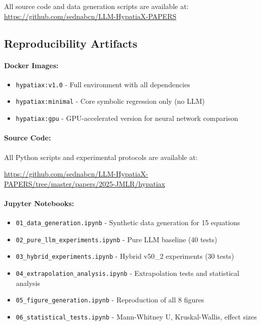 \documentclass[twoside,11pt]{article}
\begin{document}
All source code and data generation scripts are available at:
\url{https://github.com/sednabcn/LLM-HypatiaX-PAPERS}

\subsection{Reproducibility Artifacts}

\paragraph{Docker Images:}
\begin{itemize}
\item \texttt{hypatiax:v1.0} - Full environment with all dependencies
\item \texttt{hypatiax:minimal} - Core symbolic regression only (no LLM)
\item \texttt{hypatiax:gpu} - GPU-accelerated version for neural network comparison
\end{itemize}

\paragraph{Source Code:}
All Python scripts and experimental protocols are available at:
\begin{center}
{\small\url{https://github.com/sednabcn/LLM-HypatiaX-PAPERS/tree/master/papers/2025-JMLR/hypatiax}}
\end{center}

 
\paragraph{Jupyter Notebooks:}
\begin{itemize}
\item \texttt{01\_data\_generation.ipynb} - Synthetic data generation for 15 equations
\item \texttt{02\_pure\_llm\_experiments.ipynb} - Pure LLM baseline (40 tests)
\item \texttt{03\_hybrid\_experiments.ipynb} - Hybrid v50\_2 experiments (30 tests)
\item \texttt{04\_extrapolation\_analysis.ipynb} - Extrapolation tests and statistical analysis
\item \texttt{05\_figure\_generation.ipynb} - Reproduction of all 8 figures
\item \texttt{06\_statistical\_tests.ipynb} - Mann-Whitney U, Kruskal-Wallis, effect sizes
\end{itemize}
\end{document}
